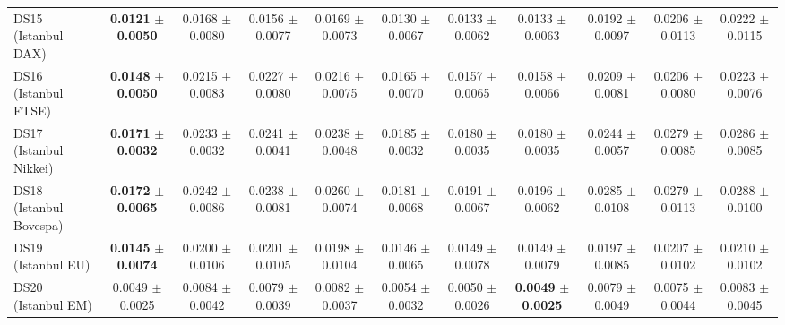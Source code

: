 \begin{table}[t]
{{\begin{tabular}{lcccccccccc}
DS15 (Istanbul DAX) & \textbf{0.0121} $\pm$ \textbf{0.0050} & 0.0168 $\pm$ 0.0080 & 0.0156 $\pm$ 0.0077 & 0.0169 $\pm$ 0.0073 & 0.0130 $\pm$ 0.0067 & 0.0133 $\pm$ 0.0062 & 0.0133 $\pm$ 0.0063 & 0.0192 $\pm$ 0.0097 & 0.0206 $\pm$ 0.0113 & 0.0222 $\pm$ 0.0115 \\
DS16 (Istanbul FTSE) & \textbf{0.0148} $\pm$ \textbf{0.0050} & 0.0215 $\pm$ 0.0083 & 0.0227 $\pm$ 0.0080 & 0.0216 $\pm$ 0.0075 & 0.0165 $\pm$ 0.0070 & 0.0157 $\pm$ 0.0065 & 0.0158 $\pm$ 0.0066 & 0.0209 $\pm$ 0.0081 & 0.0206 $\pm$ 0.0080 & 0.0223 $\pm$ 0.0076 \\
DS17 (Istanbul Nikkei) & \textbf{0.0171} $\pm$ \textbf{0.0032} & 0.0233 $\pm$ 0.0032 & 0.0241 $\pm$ 0.0041 & 0.0238 $\pm$ 0.0048 & 0.0185 $\pm$ 0.0032 & 0.0180 $\pm$ 0.0035 & 0.0180 $\pm$ 0.0035 & 0.0244 $\pm$ 0.0057 & 0.0279 $\pm$ 0.0085 & 0.0286 $\pm$ 0.0085 \\
DS18 (Istanbul Bovespa) & \textbf{0.0172} $\pm$ \textbf{0.0065} & 0.0242 $\pm$ 0.0086 & 0.0238 $\pm$ 0.0081 & 0.0260 $\pm$ 0.0074 & 0.0181 $\pm$ 0.0068 & 0.0191 $\pm$ 0.0067 & 0.0196 $\pm$ 0.0062 & 0.0285 $\pm$ 0.0108 & 0.0279 $\pm$ 0.0113 & 0.0288 $\pm$ 0.0100 \\
DS19 (Istanbul EU) & \textbf{0.0145} $\pm$ \textbf{0.0074} & 0.0200 $\pm$ 0.0106 & 0.0201 $\pm$ 0.0105 & 0.0198 $\pm$ 0.0104 & 0.0146 $\pm$ 0.0065 & 0.0149 $\pm$ 0.0078 & 0.0149 $\pm$ 0.0079 & 0.0197 $\pm$ 0.0085 & 0.0207 $\pm$ 0.0102 & 0.0210 $\pm$ 0.0102 \\
DS20 (Istanbul EM) & 0.0049 $\pm$ 0.0025 & 0.0084 $\pm$ 0.0042 & 0.0079 $\pm$ 0.0039 & 0.0082 $\pm$ 0.0037 & 0.0054 $\pm$ 0.0032 & 0.0050 $\pm$ 0.0026 & \textbf{0.0049} $\pm$ \textbf{0.0025} & 0.0079 $\pm$ 0.0049 & 0.0075 $\pm$ 0.0044 & 0.0083 $\pm$ 0.0045 \\
\bottomrule
\end{tabular}%
}%
}
\end{table}
